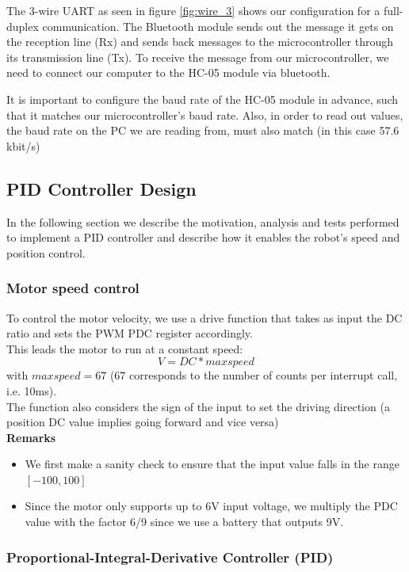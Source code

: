 \noindent
The 3-wire UART as seen in figure \ref{fig:wire_3} shows our configuration for a full-duplex communication. The Bluetooth module sends out the message it gets on the reception line (Rx) and sends back messages to the microcontroller through its transmission line (Tx). To receive the message from our microcontroller, we need to connect our computer to the HC-05 module via bluetooth.

It is important to configure the baud rate of the HC-05 module in advance, such that it matches our microcontroller's baud rate. Also, in order to read out values, the baud rate on the PC we are reading from, must also match (in this case 57.6 kbit/s)

\newpage
\subsection{PID Controller Design}

In the following section we describe the motivation, analysis and tests performed to implement a PID controller and describe how it enables the robot's speed and position control.

\subsubsection{Motor speed control}
To control the motor velocity, we use a drive function that takes as input the DC ratio and sets the PWM PDC register accordingly. \\
\noindent
This leads the motor to run at a constant speed: $$V=DC*maxspeed$$ with $maxspeed=67$ ($67$ corresponds to the number of counts per interrupt call, i.e. 10ms). \\
\vskip 0.2in
\noindent
The function also considers the sign of the input to set the driving direction (a position DC value implies going forward and vice versa)\\
\vskip 0.2in
\noindent
\textbf{Remarks}
\begin{itemize}
    \item We first make a sanity check to ensure that the input value falls in the range $[-100, 100]$
    \item Since the motor only supports up to 6V input voltage, we multiply the PDC value with the factor 6/9 since we use a battery that outputs 9V.
\end{itemize}


\subsubsection{Proportional-Integral-Derivative Controller (PID)}

